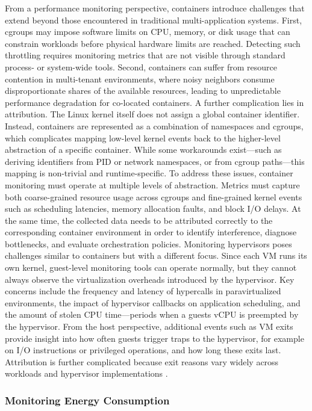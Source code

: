 From a performance monitoring perspective, containers introduce challenges that extend beyond those encountered in traditional multi-application systems. First, cgroups may impose software limits on CPU, memory, or disk usage that can constrain workloads before physical hardware limits are reached. Detecting such throttling requires monitoring metrics that are not visible through standard process- or system-wide tools. Second, containers can suffer from resource contention in multi-tenant environments, where noisy neighbors consume disproportionate shares of the available resources, leading to unpredictable performance degradation for co-located containers.
A further complication lies in attribution. The Linux kernel itself does not assign a global container identifier. Instead, containers are represented as a combination of namespaces and cgroups, which complicates mapping low-level kernel events back to the higher-level abstraction of a specific container. While some workarounds exist—such as deriving identifiers from PID or network namespaces, or from cgroup paths—this mapping is non-trivial and runtime-specific. To address these issues, container monitoring must operate at multiple levels of abstraction. Metrics must capture both coarse-grained resource usage across cgroups and fine-grained kernel events such as scheduling latencies, memory allocation faults, and block I/O delays. At the same time, the collected data needs to be attributed correctly to the corresponding container environment in order to identify interference, diagnose bottlenecks, and evaluate orchestration policies.
Monitoring hypervisors poses challenges similar to containers but with a different focus. Since each VM runs its own kernel, guest-level monitoring tools can operate normally, but they cannot always observe the virtualization overheads introduced by the hypervisor. Key concerns include the frequency and latency of hypercalls in paravirtualized environments, the impact of hypervisor callbacks on application scheduling, and the amount of stolen CPU time—periods when a guests vCPU is preempted by the hypervisor. From the host perspective, additional events such as VM exits provide insight into how often guests trigger traps to the hypervisor, for example on I/O instructions or privileged operations, and how long these exits last. Attribution is further complicated because exit reasons vary widely across workloads and hypervisor implementations \cite{gregg2020bpf}.

\subsubsection{Monitoring Energy Consumption}
\label{sec:background_monitoring_energy}

